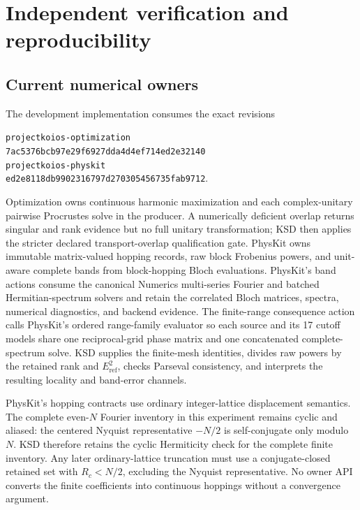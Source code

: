 \documentclass[11pt]{article}
\begin{document}
\section{Independent verification and reproducibility}

\subsection{Current numerical owners}

The development implementation consumes the exact revisions
\begin{center}
\small
\texttt{projectkoios-optimization}\\
\texttt{7ac5376bcb97e29f6927dda4d4ef714ed2e32140}\\[2pt]
\texttt{projectkoios-physkit}\\
\texttt{ed2e8118db9902316797d270305456735fab9712}.
\end{center}
Optimization owns continuous harmonic maximization and each complex-unitary pairwise
Procrustes solve in the producer. A numerically deficient overlap returns singular and
rank evidence but no full unitary transformation; KSD then applies the stricter declared
transport-overlap qualification gate. PhysKit owns immutable matrix-valued hopping
records, raw block Frobenius powers, and unit-aware complete bands from block-hopping
Bloch evaluations. PhysKit's band actions consume the canonical Numerics multi-series Fourier and batched
Hermitian-spectrum solvers and retain the correlated Bloch matrices, spectra, numerical
diagnostics, and backend evidence. The finite-range consequence action calls PhysKit's
ordered range-family evaluator so each source and its 17 cutoff models share one
reciprocal-grid phase matrix and one concatenated complete-spectrum solve. KSD supplies the finite-mesh identities, divides raw
powers by the retained rank and $E_{\mathrm{ref}}^2$, checks Parseval consistency, and interprets the
resulting locality and band-error channels.

PhysKit's hopping contracts use ordinary integer-lattice displacement semantics. The
complete even-$N$ Fourier inventory in this experiment remains cyclic and aliased: the
centered Nyquist representative $-N/2$ is self-conjugate only modulo $N$. KSD therefore
retains the cyclic Hermiticity check for the complete finite inventory. Any later
ordinary-lattice truncation must use a conjugate-closed retained set with
$R_c<N/2$, excluding the Nyquist representative. No owner API converts the finite
coefficients into continuous hoppings without a convergence argument.
\end{document}
